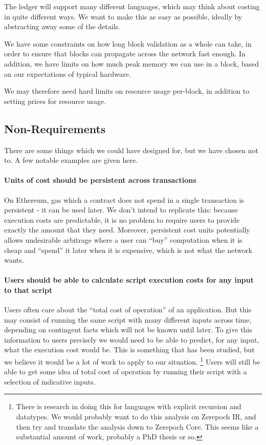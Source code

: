 \begin{requirement}
\label{req:costing-language-agnostic}
The ledger will support many different languages, which may think about costing in quite different ways.
We want to make this as easy as possible, ideally by abstracting away some of the details.
\end{requirement}

\begin{requirement}
\label{req:costing-block-budget}
We have some constraints on how long block validation as a whole can take, in order to ensure that blocks can propagate across the network fast enough.
In addition, we have limits on how much peak memory we can use in a block, based on our expectations of typical hardware.

We may therefore need hard limits on resource usage per-block, in addition to setting prices for resource usage.
\end{requirement}

\subsection{Non-Requirements}
There are some things which we could have designed for, but we have chosen not to.
A few notable examples are given here.

\paragraph{Units of cost should be persistent across transactions}
On Ethereum, gas which a contract does not spend in a single transaction is persistent - it can be used later.
We don't intend to replicate this: because execution costs are predictable, it is no problem to require users to provide exactly the amount that they need.
Moreover, persistent cost units potentially allows undesirable arbitrage where a user can ``buy'' computation when it is cheap and ``spend'' it later when it is expensive, which is not what the network wants.

\paragraph{Users should be able to calculate script execution costs for any input to that script}
Users often care about the ``total cost of operation'' of an application.
But this may consist of running the same script with many different inputs across time, depending on contingent facts which will not be known until later.
To give this information to users precisely we would need to be able to predict, for any input, what the execution cost would be.
This is something that has been studied, but we believe it would be a lot of work to apply to our situation.
\footnote{
  There is research in doing this for languages with explicit recursion and datatypes.
  We would probably want to do this analysis on Zerepoch IR, and then try and translate the analysis down to Zerepoch Core.
  This seems like a substantial amount of work, probably a PhD thesis or so.
}
Users will still be able to get some idea of total cost of operation by running their script with a selection of indicative inputs.

